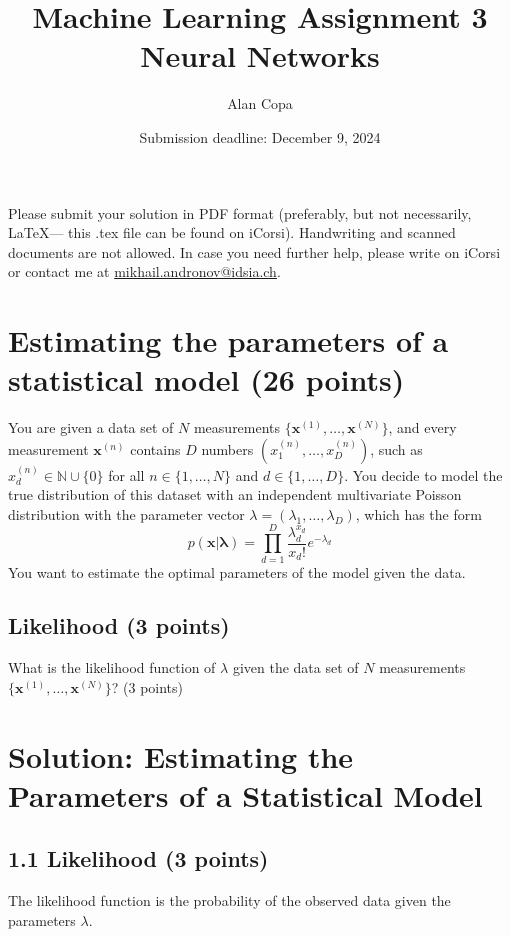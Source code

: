 \documentclass[a4paper,12pt]{article}
\title{Machine Learning Assignment 3\\
Neural Networks}
\date{Submission deadline: December 9, 2024}
\author{Alan Copa}
\begin{document}
\maketitle

\noindent Please submit your solution in PDF format (preferably, but not necessarily, \LaTeX --- this .tex file can be found on iCorsi). Handwriting and scanned documents are not allowed. 
In case you need further help, please write on iCorsi or contact me at \href{mailto:mikhail.andronov@idsia.ch}{mikhail.andronov@idsia.ch}.

\section{Estimating the parameters of a statistical model (26 points)}
You are given a data set of $N$ measurements $\{\mathbf{x}^{(1)}, \ldots, \mathbf{x}^{(N)}\}$, and every measurement $\mathbf{x}^{(n)}$ contains $D$ numbers $(x^{(n)}_1, \ldots, x^{(n)}_D)$, such as $x^{(n)}_d \in \mathbb{N} \cup \{0\}$ for all $n \in \{1, \ldots, N\}$ and $d \in \{1, \ldots, D\}$. You decide to model the true distribution of this dataset with an independent multivariate Poisson distribution with the parameter vector $\lambda = (\lambda_1, \ldots, \lambda_D)$, which has the form
\begin{equation}
    p(\mathbf{x} | \mathbf{\lambda}) = \prod_{d=1}^{D}\frac{\lambda_d^{x_d}}{x_d!}e^{-\lambda_d}
\end{equation}
You want to estimate the optimal parameters of the model given the data.

\subsection{Likelihood (3 points)}
What is the likelihood function of $\lambda$ given the data set of $N$ measurements $\{\mathbf{x}^{(1)}, \ldots, \mathbf{x}^{(N)}\}$?
(3 points)

\section*{Solution: Estimating the Parameters of a Statistical Model}

\subsection*{1.1 Likelihood (3 points)}
The likelihood function is the probability of the observed data given the parameters \(\lambda\).
\end{document}
